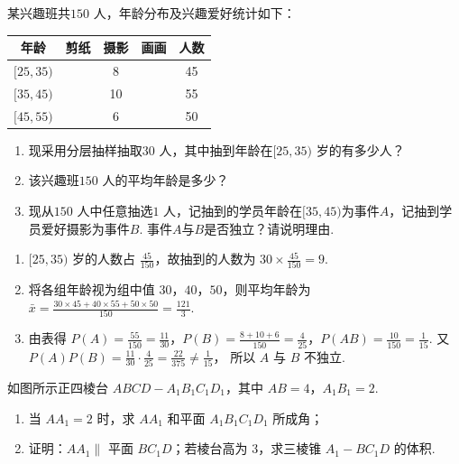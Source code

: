 \begin{problem}
某兴趣班共\(150\text{ 人}\)，年龄分布及兴趣爱好统计如下：

\begin{center}
\renewcommand{\arraystretch}{1.25}
\begin{tabular}{|c|c|c|c|c|}
\hline
年龄 & 剪纸 & 摄影 & 画画 & 人数 \\
\hline
\([25,35)\) & & 8 & & 45 \\
\hline
\([35,45)\) & & 10 & & 55 \\
\hline
\([45,55)\) & & 6 & & 50 \\
\hline
\end{tabular}
\end{center}

\begin{enumerate}
\item 现采用分层抽样抽取\(30\text{ 人}\)，其中抽到年龄在\([25,35)\text{ 岁}\)的有多少人？
\item 该兴趣班\(150\text{ 人}\)的平均年龄是多少？
\item 现从\(150\text{ 人}\)中任意抽选\(1\text{ 人}\)，记抽到的学员年龄在\([35,45)\)为事件\(A\)，记抽到学员爱好摄影为事件\(B\). 事件\(A\)与\(B\)是否独立？请说明理由.
\end{enumerate}
\end{problem}

\begin{solution}
\begin{enumerate}
\item \([25,35)\) 岁的人数占 \(\frac{45}{150}\)，故抽到的人数为 \(30\times \frac{45}{150}=9\).

\item 将各组年龄视为组中值 \(30\)，\(40\)，\(50\)，则平均年龄为
\(\bar x=\frac{30\times45+40\times55+50\times50}{150}=\frac{121}{3}\).

\item 由表得
\(P(A)=\frac{55}{150}=\frac{11}{30}\)，\(P(B)=\frac{8+10+6}{150}=\frac{4}{25}\)，\(P(AB)=\frac{10}{150}=\frac{1}{15}\). 又 \(P(A)P(B)=\frac{11}{30}\cdot\frac{4}{25}=\frac{22}{375}\ne\frac{1}{15}\)，
所以 \(A\) 与 \(B\) 不独立.
\end{enumerate}
\end{solution}

\begin{problem}
如图所示正四棱台 \(ABCD-A_1B_1C_1D_1\)，其中 \(AB=4\)，\(A_1B_1=2\).
\begin{enumerate}
\item 当 \(AA_1=2\) 时，求 \(AA_1\) 和平面 \(A_1B_1C_1D_1\) 所成角；
\item 证明：\(AA_1\parallel\) 平面 \(BC_1D\)；若棱台高为 3，求三棱锥 \(A_1-BC_1D\) 的体积.
\end{enumerate}

\end{problem}

